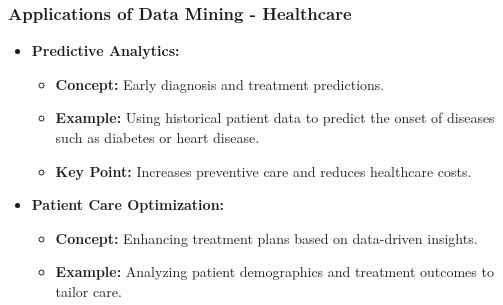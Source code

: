 \documentclass{beamer}
\begin{document}
\begin{frame}[fragile]
    \frametitle{Applications of Data Mining - Healthcare}
    \begin{itemize}
        \item \textbf{Predictive Analytics:}
            \begin{itemize}
                \item \textbf{Concept:} Early diagnosis and treatment predictions.
                \item \textbf{Example:} Using historical patient data to predict the onset of diseases such as diabetes or heart disease.
                \item \textbf{Key Point:} Increases preventive care and reduces healthcare costs.
            \end{itemize}
        \item \textbf{Patient Care Optimization:}
            \begin{itemize}
                \item \textbf{Concept:} Enhancing treatment plans based on data-driven insights.
                \item \textbf{Example:} Analyzing patient demographics and treatment outcomes to tailor care.
            \end{itemize}
    \end{itemize}
\end{frame}
\end{document}
